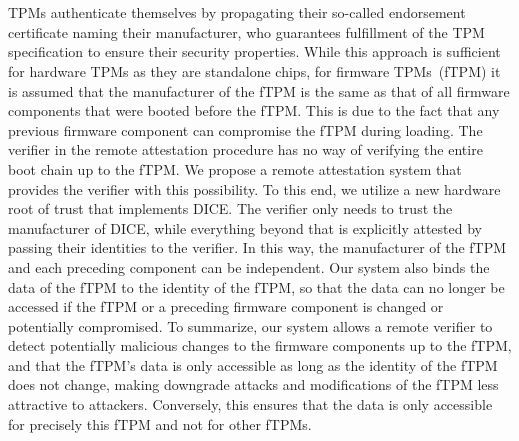 \chapter{\abstractname}

TPMs authenticate themselves by propagating their so-called endorsement certificate naming their manufacturer, who guarantees fulfillment of the TPM specification to ensure their security properties.
While this approach is sufficient for hardware TPMs as they are standalone chips, for firmware TPMs~(fTPM) it is assumed that the manufacturer of the fTPM is the same as that of all firmware components that were booted before the fTPM\@.
This is due to the fact that any previous firmware component can compromise the fTPM during loading.
The verifier in the remote attestation procedure has no way of verifying the entire boot chain up to the fTPM\@.
We propose a remote attestation system that provides the verifier with this possibility.
To this end, we utilize a new hardware root of trust that implements DICE\@.
The verifier only needs to trust the manufacturer of DICE, while everything beyond that is explicitly attested by passing their identities to the verifier.
In this way, the manufacturer of the fTPM and each preceding component can be independent.
Our system also binds the data of the fTPM to the identity of the fTPM, so that the data can no longer be accessed if the fTPM or a preceding firmware component is changed or potentially compromised.
To summarize, our system allows a remote verifier to detect potentially malicious changes to the firmware components up to the fTPM, and that the fTPM's data is only accessible as long as the identity of the fTPM does not change, making downgrade attacks and modifications of the fTPM less attractive to attackers.
Conversely, this ensures that the data is only accessible for precisely this fTPM and not for other fTPMs.
